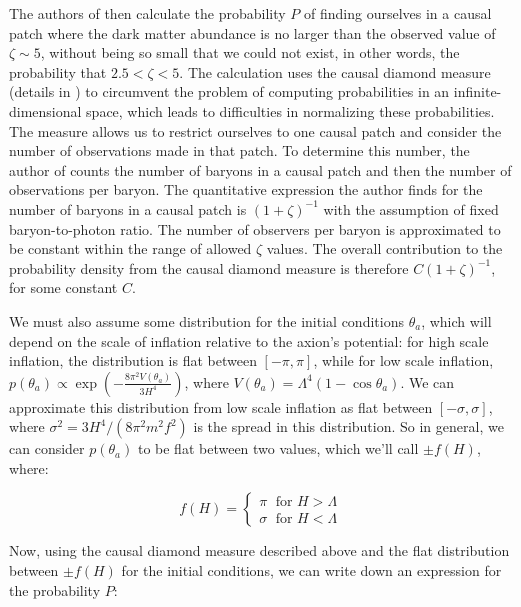 \documentclass{article}
\begin{document}
The authors of \cite{exploring-string-axiverse} then calculate the probability $P$ of finding ourselves in a causal patch where the dark matter abundance is no larger than the observed value of $\zeta \sim 5$, without being so small that we could not exist, in other words, the probability that $2.5<\zeta<5$. The calculation uses the causal diamond measure (details in \cite{anthropic-explanation}) to circumvent the problem of computing probabilities in an infinite-dimensional space, which leads to difficulties in normalizing these probabilities. The measure allows us to restrict ourselves to one causal patch and consider the number of observations made in that patch. To determine this number, the author of \cite{anthropic-explanation} counts the number of baryons in a causal patch and then the number of observations per baryon. The quantitative expression the author finds for the number of baryons in a causal patch is $(1+\zeta)^{-1}$ with the assumption of fixed baryon-to-photon ratio. The number of observers per baryon is approximated to be constant within the range of allowed $\zeta$ values. The overall contribution to the probability density from the causal diamond measure is therefore $C(1+\zeta)^{-1}$, for some constant $C$.

We must also assume some distribution for the initial conditions $\theta_a$, which will depend on the scale of inflation relative to the axion's potential: for high scale inflation, the distribution is flat between $[-\pi,\pi]$, while for low scale inflation,     $p(\theta_a) \propto \exp{\left(-\frac{8\pi^2V(\theta_a)}{3H^4}\right)}$, where $V(\theta_a)=\Lambda^4(1-\cos{\theta_a})$. We can approximate this distribution from low scale inflation as flat between $[-\sigma,\sigma]$, where $\sigma^2 = 3H^4/(8\pi^2m^2f^2)$ is the spread in this distribution. So in general, we can consider $p(\theta_a)$ to be flat between two values, which we'll call $\pm f(H)$, where:

\begin{equation}
\label{eq:f(H)}
    f(H) = \begin{cases}
        \pi \; \text{ for } H>\Lambda\\
        \sigma \; \text{ for } H < \Lambda
    \end{cases}
\end{equation}

Now, using the causal diamond measure described above and the flat distribution between $\pm f(H)$ for the initial conditions, we can write down an expression for the probability $P$:
\end{document}
